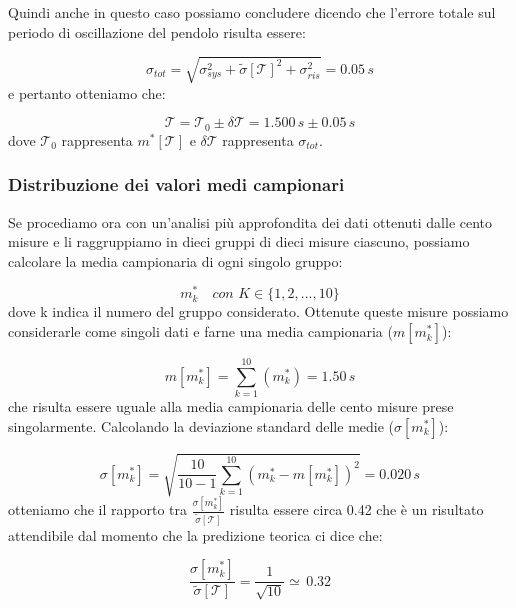 Quindi anche in questo caso possiamo concludere dicendo che l'errore totale sul periodo di oscillazione del pendolo risulta essere:

\begin{equation}
	\sigma_{tot} = \sqrt{\sigma_{sys}^2 + \tilde{\sigma}[\mathcal{T}]^2 + \sigma_{ris}^2} = 0.05 \,s
\end{equation}
e pertanto otteniamo che:

\begin{equation}
	\mathcal{T} = \mathcal{T}_0 \pm \delta\mathcal{T} = 1.500\,s \pm 0.05\,s
\end{equation}
dove $\mathcal{T}_0$ rappresenta $m^*[\mathcal{T}]$ e $\delta\mathcal{T}$ rappresenta $\sigma_{tot}$.

\subsubsection{Distribuzione dei valori medi campionari}

Se procediamo ora con un'analisi più approfondita dei dati ottenuti dalle cento misure e li raggruppiamo in dieci gruppi di dieci misure ciascuno, possiamo calcolare la media campionaria di ogni singolo gruppo:

\begin{equation}
m_k^* \quad con \,\, K \in{\{1,2,...,10\}}
\end{equation}
dove k indica il numero del gruppo considerato.
Ottenute queste misure possiamo considerarle come singoli dati e farne una media campionaria ($ m[m_k^*] $):

\begin{equation}
m[m_k^*] = \sum_{k=1}^{10} (m_k^*) = 1.50\,s
\end{equation}
che risulta essere uguale alla media campionaria delle cento misure prese singolarmente. Calcolando la deviazione standard delle medie ($ \sigma[m_k^*] $):

\begin{equation}
\sigma[m_k^*] = \sqrt{\frac{10}{10-1} \sum_{k=1}^{10} (m_k^* - m[m_k^*])^2} = 0.020\,s
\end{equation}
otteniamo che il rapporto tra $\frac{\sigma[m_k^*]}{\tilde{\sigma}[\mathcal{T}]}$ risulta essere circa 0.42 che è un risultato attendibile dal momento che la predizione teorica ci dice che:

\begin{equation}
\frac{\sigma[m_k^*]}{\tilde{\sigma}[\mathcal{T}]} = \frac{1}{\sqrt{10}} \simeq \, 0.32
\end{equation}
